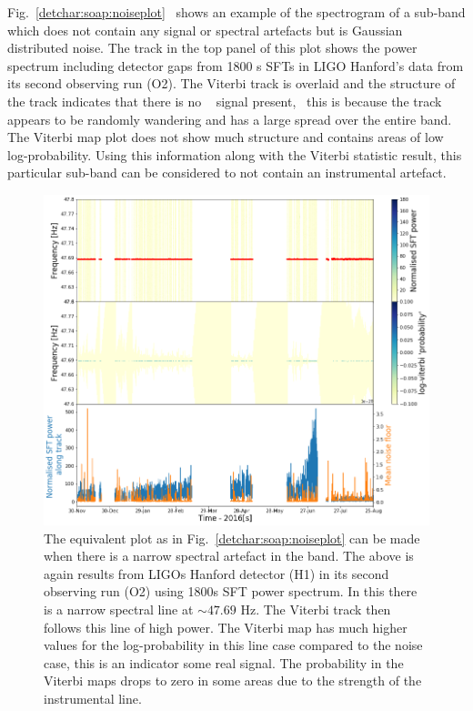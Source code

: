 %
Fig.~\ref{detchar:soap:noiseplot}~ shows an example of the spectrogram of a
sub-band which does not contain any signal or spectral artefacts but is
Gaussian distributed noise.  The track in the top panel of this plot shows the
power spectrum including detector gaps from 1800 s \glspl{SFT} in \gls{LIGO}
Hanford's data from its second observing run (O2).  The Viterbi track is
overlaid and the structure of the track indicates that there is no
~ signal
present,~ this is because the track appears to be randomly wandering and has a
large spread over the entire band. The Viterbi map plot does not show much
structure and contains areas of low log-probability.  Using this information
along with the Viterbi statistic result, this particular sub-band can be
considered to not contain an instrumental artefact. 
%
\begin{figure}
	\centering
	\includegraphics[width=\textwidth]{C5_detchar/track_F47_6_47_8_linenarrow.png}
	\caption[Example SOAP output for string narrow instrumental line.]{The equivalent plot as in Fig.~\ref{detchar:soap:noiseplot} can be made when there is a narrow spectral artefact in the band. The above is again results from \glspl{LIGO} Hanford detector (H1) in its second observing run (O2) using 1800s \gls{SFT} power spectrum. In this there is a narrow spectral line at $\sim 47.69$ Hz. The Viterbi track then follows this line of high power. The Viterbi map has much higher values for the log-probability in this line case compared to the noise case, this is an indicator some real signal. The probability in the Viterbi maps drops to zero in some areas due to the strength of the instrumental line. }
	\label{detchar:soap:lineplot}
\end{figure}
%

